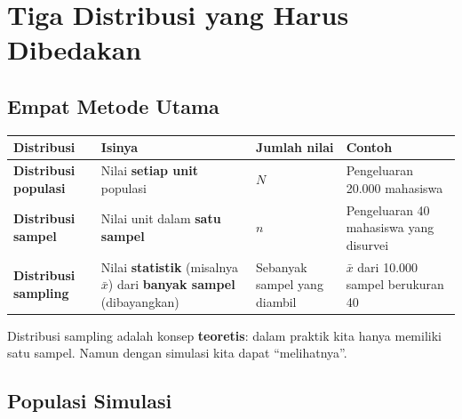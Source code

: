 \documentclass[
  indonesian,
  letterpaper,
]{book}
\newcounter{none} %
\begin{document}
\section{Tiga Distribusi yang Harus
Dibedakan}\label{tiga-distribusi-yang-harus-dibedakan}

\subsection{Empat Metode Utama}\label{empat-metode-utama}

{\def\LTcaptype{none} %
\begin{longtable}[]{@{}
  >{\raggedright\arraybackslash}p{}
  >{\raggedright\arraybackslash}p{}
  >{\raggedright\arraybackslash}p{}
  >{\raggedright\arraybackslash}p{}@{}}
\toprule\noalign{}
\begin{minipage}[b]{\linewidth}\raggedright
Distribusi
\end{minipage} & \begin{minipage}[b]{\linewidth}\raggedright
Isinya
\end{minipage} & \begin{minipage}[b]{\linewidth}\raggedright
Jumlah nilai
\end{minipage} & \begin{minipage}[b]{\linewidth}\raggedright
Contoh
\end{minipage} \\
\midrule\noalign{}
\endhead
\bottomrule\noalign{}
\endlastfoot
\textbf{Distribusi populasi} & Nilai \textbf{setiap unit} populasi &
\(N\) & Pengeluaran 20.000 mahasiswa \\
\textbf{Distribusi sampel} & Nilai unit dalam \textbf{satu sampel} &
\(n\) & Pengeluaran 40 mahasiswa yang disurvei \\
\textbf{Distribusi sampling} & Nilai \textbf{statistik} (misalnya
\(\bar{x}\)) dari \textbf{banyak sampel} (dibayangkan) & Sebanyak sampel
yang diambil & \(\bar{x}\) dari 10.000 sampel berukuran 40 \\
\end{longtable}
}

Distribusi sampling adalah konsep \textbf{teoretis}: dalam praktik kita
hanya memiliki satu sampel. Namun dengan simulasi kita dapat
``melihatnya''.

\subsection{Populasi Simulasi}\label{populasi-simulasi}
\end{document}
